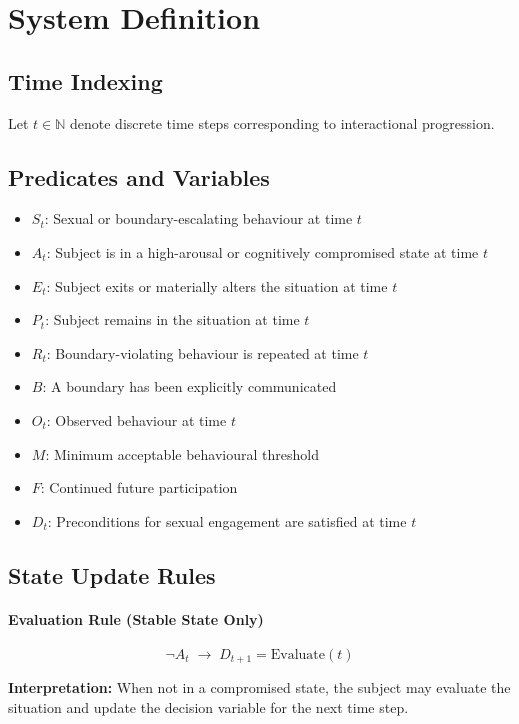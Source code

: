\documentclass{article}
\begin{document}
	\section*{System Definition}
	
	\subsection*{Time Indexing}
	
	Let $t \in \mathbb{N}$ denote discrete time steps corresponding to interactional progression.
	
	\subsection*{Predicates and Variables}
	
	\begin{itemize}
		\item $S_t$: Sexual or boundary-escalating behaviour at time $t$
		\item $A_t$: Subject is in a high-arousal or cognitively compromised state at time $t$
		\item $E_t$: Subject exits or materially alters the situation at time $t$
		\item $P_t$: Subject remains in the situation at time $t$
		\item $R_t$: Boundary-violating behaviour is repeated at time $t$
		\item $B$: A boundary has been explicitly communicated
		\item $O_t$: Observed behaviour at time $t$
		\item $M$: Minimum acceptable behavioural threshold
		\item $F$: Continued future participation
		\item $D_t$: Preconditions for sexual engagement are satisfied at time $t$
	\end{itemize}
	
	\subsection*{State Update Rules}
	
	\paragraph{Evaluation Rule (Stable State Only)}
	\[
	\neg A_t \;\rightarrow\; D_{t+1} = \text{Evaluate}(t)
	\]
	
	\textbf{Interpretation:}  
	When not in a compromised state, the subject may evaluate the situation and update the decision variable for the next time step.
	
\end{document}
